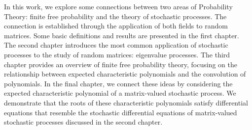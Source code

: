 In this work, we explore some connections between two areas of Probability Theory: finite free probability and the theory of stochastic processes. The connection is established through the application of both fields to random matrices. Some basic definitions and results are presented in the first chapter. The second chapter introduces the most common application of stochastic processes to the study of random matrices: eigenvalue processes. The third chapter provides an overview of finite free probability theory, focusing on the relationship between expected characteristic polynomials and the convolution of polynomials. In the final chapter, we connect these ideas by considering the expected characteristic polynomial of a matrix-valued stochastic process. We demonstrate that the roots of these characteristic polynomials satisfy differential equations that resemble the stochastic differential equations of matrix-valued stochastic processes discussed in the second chapter.